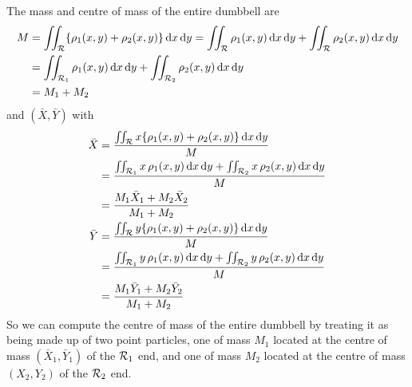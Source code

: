 \begin{eg}
\begin{equation*}
\end{equation*}
The mass and centre of mass of the entire dumbbell are
\begin{align*}
M&= \iint_{\mathcal{R}} \{\rho_1(x,y)+\rho_2(x,y)\}\,\mathrm{d}x\,\mathrm{d}y
 = \iint_{\mathcal{R}} \rho_1(x,y)\,\mathrm{d}x\,\mathrm{d}y
      +\iint_{\mathcal{R}} \rho_2(x,y)\,\mathrm{d}x\,\mathrm{d}y \\
 &= \iint_{\mathcal{R}_1} \rho_1(x,y)\,\mathrm{d}x\,\mathrm{d}y
      +\iint_{\mathcal{R}_2} \rho_2(x,y)\,\mathrm{d}x\,\mathrm{d}y \\
 &=M_1+M_2
\end{align*}
and $(\bar X,\bar Y)$ with
\begin{align*}
\bar X &=\frac{\iint_{\mathcal{R}} 
                  x\{\rho_1(x,y)+\rho_2(x,y)\}\,\mathrm{d}x\,\mathrm{d}y}{M}\\
&=\frac{\iint_{\mathcal{R}_1} x\,\rho_1(x,y)\,\mathrm{d}x\,\mathrm{d}y
         +\iint_{\mathcal{R}_2} x\,\rho_2(x,y)\,\mathrm{d}x\,\mathrm{d}y}{M}\\
       &=\frac{M_1 \bar X_1 + M_2 \bar X_2}{M_1+M_2}
\\
\bar Y &=\frac{\iint_{\mathcal{R}} 
                  y\{\rho_1(x,y)+\rho_2(x,y)\}\,\mathrm{d}x\,\mathrm{d}y}{M}\\
&=\frac{\iint_{\mathcal{R}_1} y\,\rho_1(x,y)\,\mathrm{d}x\,\mathrm{d}y
         +\iint_{\mathcal{R}_2} y\,\rho_2(x,y)\,\mathrm{d}x\,\mathrm{d}y}{M}\\
       &=\frac{M_1 \bar Y_1 + M_2 \bar Y_2}{M_1+M_2}
\end{align*}
So we can compute the centre of mass of the entire dumbbell by treating
it as being made up of two point particles, one of mass $M_1$ located at
the centre of mass $(\bar X_1,\bar Y_1)$ of the $\mathcal{R}_1$ end, and one of mass 
$M_2$ located at the centre of mass $(X_2,Y_2)$ of the $\mathcal{R}_2$ end.
\end{eg}


